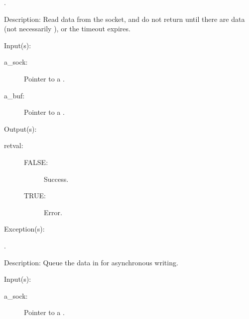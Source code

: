 \begin{capi}
\begin{capilist}
\begin{description}
		\item[.]
		\end{description}
	\item[Description: ]
		Read data from the socket, and do not return until there are
		data (not necessarily ), or the timeout
		expires.
	\end{capilist}
\label{sock_write}
	\begin{capilist}
	\item[Input(s): ]
		\begin{description}\item[]
		\item[a\_sock: ]
			Pointer to a .
		\item[a\_buf: ]
			Pointer to a .
		\end{description}
	\item[Output(s): ]
		\begin{description}\item[]
		\item[retval: ]
			\begin{description}\item[]
			\item[FALSE: ] Success.
			\item[TRUE: ] Error.
			\end{description}
		\end{description}
	\item[Exception(s): ]
		\begin{description}\item[]
		\item[.]
		\end{description}
	\item[Description: ]
		Queue the data in  for asynchronous writing.
	\end{capilist}
\label{sock_out_flush}
	\begin{capilist}
	\item[Input(s): ]
		\begin{description}\item[]
		\item[a\_sock: ]
			Pointer to a \classname{sock}.
		\end{description}

\end{capilist}
\end{capi}
